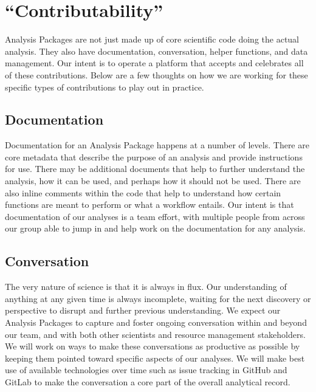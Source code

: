 \documentclass[letterpaper,10pt,english]{sphinxmanual}
\begin{document}
\section{“Contributability”}
\label{\detokenize{devmethods:contributability}}
Analysis Packages are not just made up of core scientific code doing the actual analysis. They also have documentation, conversation, helper functions, and data management. Our intent is to operate a platform that accepts and celebrates all of these contributions. Below are a few thoughts on how we are working for these specific types of contributions to play out in practice.


\subsection{Documentation}
\label{\detokenize{devmethods:documentation}}
Documentation for an Analysis Package happens at a number of levels. There are core metadata that describe the purpose of an analysis and provide instructions for use. There may be additional documents that help to further understand the analysis, how it can be used, and perhaps how it should not be used. There are also inline comments within the code that help to understand how certain functions are meant to perform or what a workflow entails. Our intent is that documentation of our analyses is a team effort, with multiple people from across our group able to jump in and help work on the documentation for any analysis.


\subsection{Conversation}
\label{\detokenize{devmethods:conversation}}
The very nature of science is that it is always in flux. Our understanding of anything at any given time is always incomplete, waiting for the next discovery or perspective to disrupt and further previous understanding. We expect our Analysis Packages to capture and foster ongoing conversation within and beyond our team, and with both other scientists and resource management stakeholders. We will work on ways to make these conversations as productive as possible by keeping them pointed toward specific aspects of our analyses. We will make best use of available technologies over time such as issue tracking in GitHub and GitLab to make the conversation a core part of the overall analytical record.
\end{document}
